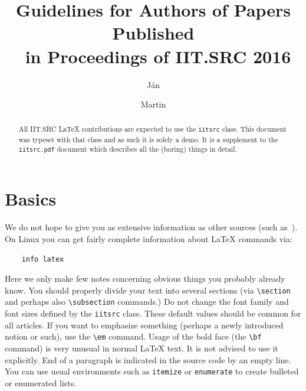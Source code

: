\documentclass{iitsrc}
\title{Guidelines for Authors of Papers Published\\~in Proceedings of IIT.SRC 2016}
\author{Ján}{Novák}
\author{Martin}{Kováč}
\begin{document}
\begin{abstract}
All IIT.SRC \LaTeX{} contributions are expected to use the {\tt iitsrc}
class. This document was typeset with that class and as such it is
solely a demo. It is a supplement to the {\tt iitsrc.pdf} document which
describes all the (boring) things in detail.\footnotemark
\end{abstract}

\section{Basics}
%
%
We do not hope to give you as extensive information as other sources (such
as~\cite{lamport:latex}). On Linux you can get fairly complete
information about \LaTeX{} commands via:

\begin{verbatim}
    info latex
\end{verbatim}
Here we only make few notes concerning obvious things you probably
already know.
%
You should properly divide your text into several sections (via
\verb|\section| and perhaps also \verb|\subsection| commands.)
%
Do not change the font family and font sizes defined by the
\verb|iitsrc| class. These default values should be common for all
articles.
%
If you want to emphasize something (perhaps a newly introduced notion
or such), use the \verb|\em| command.
%
Usage of the bold face (the \verb|\bf| command) is very unusual in
normal \LaTeX{} text. It is not advised to use it explicitly.
%
End of a paragraph is indicated in the source code by an empty line.
%
You can use usual environments such as \verb|itemize| or
\verb|enumerate| to create bulleted or enumerated lists.
%
\end{document}
